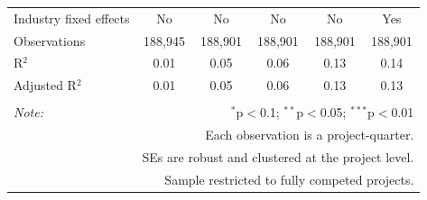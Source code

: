 \documentclass[
]{article}
\begin{document}
\begin{table}[H]
\begin{tabular}{@{\extracolsep{-2pt}}lccccc}
Industry fixed effects & No & No & No & No & Yes \\ 
Observations & 188,945 & 188,901 & 188,901 & 188,901 & 188,901 \\ 
R$^{2}$ & 0.01 & 0.05 & 0.06 & 0.13 & 0.14 \\ 
Adjusted R$^{2}$ & 0.01 & 0.05 & 0.06 & 0.13 & 0.13 \\ 
\hline 
\hline \\[-1.8ex] 
\textit{Note:}  & \multicolumn{5}{r}{$^{*}$p$<$0.1; $^{**}$p$<$0.05; $^{***}$p$<$0.01} \\ 
 & \multicolumn{5}{r}{Each observation is a project-quarter.} \\ 
 & \multicolumn{5}{r}{SEs are robust and clustered at the project level.} \\ 
 & \multicolumn{5}{r}{Sample restricted to fully competed projects.} \\ 
\end{tabular} 
\end{table}
\end{document}
